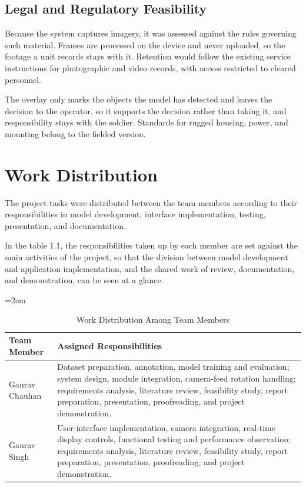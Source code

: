 \subsection{Legal and Regulatory Feasibility}
Because the system captures imagery, it was assessed against the rules governing such material.
Frames are processed on the device and never uploaded, so the footage a unit records stays with it.
Retention would follow the existing service instructions for photographic and video records, with
access restricted to cleared personnel.

The overlay only marks the objects the model has detected and leaves the decision to the operator,
so it supports the decision rather than taking it, and responsibility stays with the soldier.
Standards for rugged housing, power, and mounting belong to the fielded version.
\endgroup

\label{end:feasibility}
\clearpage
\section{Work Distribution}\label{sec:work}
The project tasks were distributed between the team members according to their
responsibilities in model development, interface implementation, testing, presentation,
and documentation.

\vspace{6pt}
In the table 1.1, the responsibilities taken up by each member are set against the main activities
of the project, so that the division between model development and application implementation, and
the shared work of review, documentation, and demonstration, can be seen at a glance.
\begin{table}[htbp]
  \centering
  \caption{Work Distribution Among Team Members}\label{tab:work}
  \renewcommand{\arraystretch}{1.2}
  \begingroup\emergencystretch=2em
  \begin{tabular}{|>{\arraybackslash}p{4.3cm}|>{\arraybackslash}p{10cm}|}
    \hline
    \textbf{Team Member} & \textbf{Assigned Responsibilities} \\
    \hline
    Gaurav Chauhan & Dataset preparation, annotation, model training and evaluation; system design, module integration, camera-feed rotation handling; requirements analysis, literature review, feasibility study, report preparation, presentation, proofreading, and project demonstration. \\
    \hline
    Gaurav Singh & User-interface implementation, camera integration, real-time display controls, functional testing and performance observation; requirements analysis, literature review, feasibility study, report preparation, presentation, proofreading, and project demonstration. \\
    \hline
  \end{tabular}
  \endgroup
\end{table}
\label{end:work}\label{end:introduction}
